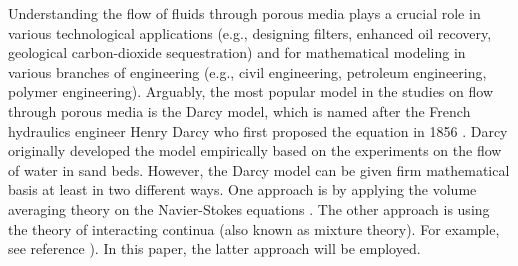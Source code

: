 \documentclass[11pt,reqno]{amsart}
\begin{document}
Understanding the flow of fluids through porous 
media plays a crucial role in various technological 
applications (e.g., designing filters, enhanced oil 
recovery, geological carbon-dioxide sequestration) 
and for mathematical modeling in various branches 
of engineering (e.g., civil engineering, petroleum 
engineering, polymer engineering). 
Arguably, the most popular model in the studies 
on flow through porous media is the Darcy model, 
which is named after the French hydraulics engineer 
Henry Darcy who first proposed the equation in 1856 
\cite{Darcy_1856}. 
Darcy originally developed the model empirically 
based on the experiments on the flow of water 
in sand beds. 
However, the Darcy model can be given firm mathematical 
basis at least in two different ways. One approach is by 
applying the volume averaging theory on the Navier-Stokes 
equations \cite{Derivation_of_Darcys_Law}. The other 
approach is using the theory of interacting continua 
(also known as mixture theory). For example, see reference 
\cite[Introduction]{Nakshatrala_Rajagopal_IJNMF_2011_v67_p342}). 
In this paper, the latter approach will be employed. 
  
\end{document}
